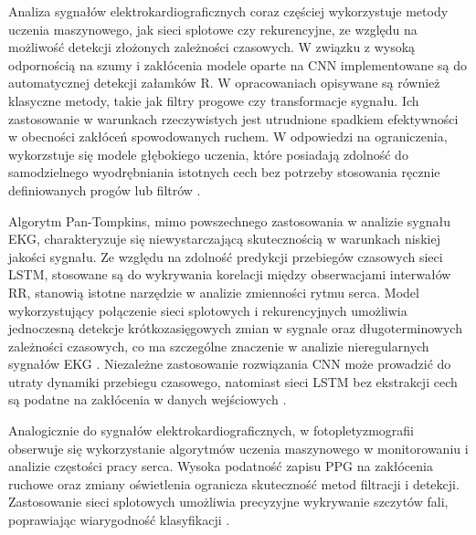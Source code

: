 \documentclass[journal]{IEEEtran}
\begin{document}
Analiza sygnałów elektrokardiograficznych coraz częściej wykorzystuje metody uczenia maszynowego, jak sieci splotowe czy rekurencyjne, ze względu na możliwość detekcji złożonych zależności czasowych. W związku z wysoką odpornością na szumy i zakłócenia modele oparte na CNN implementowane są do automatycznej detekcji załamków R. W opracowaniach opisywane są również klasyczne metody, takie jak filtry progowe czy transformacje sygnału. Ich zastosowanie w warunkach rzeczywistych jest utrudnione spadkiem efektywności w obecności zakłóceń spowodowanych ruchem. W odpowiedzi na ograniczenia, wykorzstuje się modele głębokiego uczenia, które posiadają zdolność do samodzielnego wyodrębniania istotnych cech bez potrzeby stosowania ręcznie definiowanych progów lub filtrów \cite{1}.

Algorytm Pan-Tompkins, mimo powszechnego zastosowania w analizie sygnału EKG, charakteryzuje się niewystarczającą skutecznością w warunkach niskiej jakości sygnału. Ze względu na zdolność predykcji przebiegów czasowych sieci LSTM, stosowane są do wykrywania korelacji między obserwacjami interwałów RR, stanowią istotne narzędzie w analizie zmienności rytmu serca.
Model wykorzystujący połączenie sieci splotowych i rekurencyjnych umożliwia jednoczesną detekcje krótkozasięgowych zmian w sygnale oraz długoterminowych zależności czasowych, co ma szczególne znaczenie w analizie nieregularnych sygnałów EKG \cite{2}. Niezależne zastosowanie rozwiązania CNN może prowadzić do utraty dynamiki przebiegu czasowego, natomiast sieci LSTM bez ekstrakcji cech są podatne na zakłócenia w danych wejściowych \cite{3}.

\newpage
Analogicznie do sygnałów elektrokardiograficznych, w fotopletyzmografii obserwuje się wykorzystanie algorytmów uczenia maszynowego w monitorowaniu i analizie częstości pracy serca. Wysoka podatność zapisu PPG na zakłócenia ruchowe oraz zmiany oświetlenia ogranicza skuteczność metod filtracji i detekcji. Zastosowanie sieci splotowych umożliwia precyzyjne wykrywanie szczytów fali, poprawiając wiarygodność klasyfikacji \cite{4}.
\end{document}
